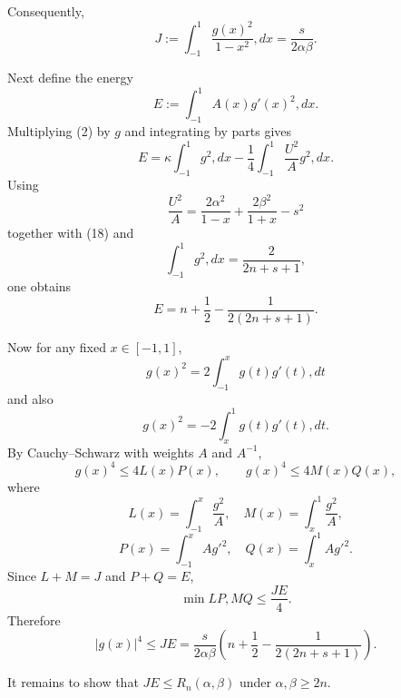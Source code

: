 \documentclass[11pt]{article}
\begin{document}
Consequently,
\begin{equation}
\boxed{
J:=\int_{-1}^{1}\frac{g(x)^2}{1-x^2},dx
=
\frac{s}{2\alpha\beta}.
}
\tag{19}
\end{equation}

Next define the energy
\begin{equation*}
E:=\int_{-1}^{1}A(x)g'(x)^2,dx.
\end{equation*}
Multiplying (2) by \(g\) and integrating by parts gives
\begin{equation*}
E
=
\kappa\int_{-1}^{1}g^2,dx
-\frac14\int_{-1}^{1}\frac{U^2}{A}g^2,dx.
\end{equation*}
Using
\begin{equation*}
\frac{U^2}{A}
=
\frac{2\alpha^2}{1-x}
+
\frac{2\beta^2}{1+x}
-s^2
\end{equation*}
together with (18) and
\begin{equation*}
\int_{-1}^{1}g^2,dx=\frac{2}{2n+s+1},
\end{equation*}
one obtains
\begin{equation}
\boxed{
E
=
n+\frac12-\frac{1}{2(2n+s+1)}.
}
\tag{20}
\end{equation}

Now for any fixed \(x\in[-1,1]\),
\begin{equation*}
g(x)^2
=
2\int_{-1}^{x}g(t)g'(t),dt
\end{equation*}
and also
\begin{equation*}
g(x)^2
=
-2\int_x^1g(t)g'(t),dt.
\end{equation*}
By Cauchy–Schwarz with weights \(A\) and \(A^{-1}\),
\begin{equation*}
g(x)^4
\le
4L(x)P(x),
\qquad
g(x)^4
\le
4M(x)Q(x),
\end{equation*}
where
\begin{equation*}
L(x)=\int_{-1}^{x}\frac{g^2}{A},\quad
M(x)=\int_x^1\frac{g^2}{A},
\end{equation*}
\begin{equation*}
P(x)=\int_{-1}^{x}Ag'^2,\quad
Q(x)=\int_x^1Ag'^2.
\end{equation*}
Since \(L+M=J\) and \(P+Q=E\),
\begin{equation*}
\min{L P,M Q}\le \frac{JE}{4}.
\end{equation*}
Therefore
\begin{equation}
\boxed{
|g(x)|^4\le JE
=
\frac{s}{2\alpha\beta}
\left(
n+\frac12-\frac{1}{2(2n+s+1)}
\right).
}
\tag{21}
\end{equation}

It remains to show that \(JE\le R_n(\alpha,\beta)\) under \(\alpha,\beta\ge2n\).
\end{document}
